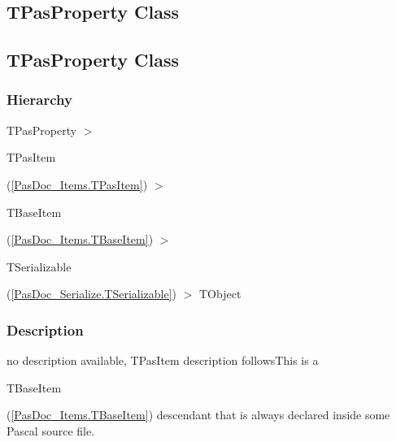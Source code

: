 \documentclass{report}
\begin{document}
\subsection*{\large{\textbf{TPasProperty Class}}\normalsize\hspace{1ex}\hrulefill}
\else
\subsection*{TPasProperty Class}
\fi
\label{PasDoc_Items.TPasProperty}
\subsubsection*{\large{\textbf{Hierarchy}}\normalsize\hspace{1ex}\hfill}
TPasProperty {$>$} \begin{ttfamily}TPasItem\end{ttfamily}(\ref{PasDoc_Items.TPasItem}) {$>$} \begin{ttfamily}TBaseItem\end{ttfamily}(\ref{PasDoc_Items.TBaseItem}) {$>$} \begin{ttfamily}TSerializable\end{ttfamily}(\ref{PasDoc_Serialize.TSerializable}) {$>$} 
TObject
\subsubsection*{\large{\textbf{Description}}\normalsize\hspace{1ex}\hfill}
no description available, TPasItem description followsThis is a \begin{ttfamily}TBaseItem\end{ttfamily}(\ref{PasDoc_Items.TBaseItem}) descendant that is always declared inside some Pascal source file.
\end{document}
